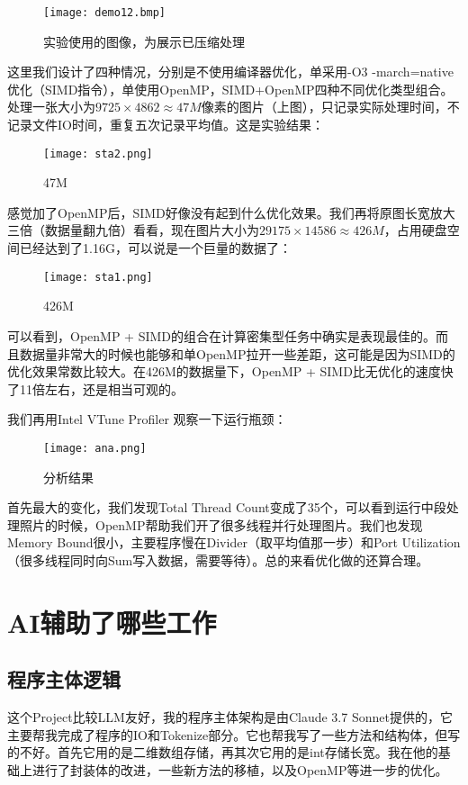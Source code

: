 \documentclass[11pt]{article}
\begin{document}
\begin{figure}[H]
  \centering
  \texttt{[image: demo12.bmp]}
  \caption{实验使用的图像，为展示已压缩处理}
  \label{fig:example}
\end{figure}


这里我们设计了四种情况，分别是不使用编译器优化，单采用-O3 -march=native优化（SIMD指令），单使用OpenMP，SIMD+OpenMP四种不同优化类型组合。处理一张大小为$9725\times 4862 \approx 47M$像素的图片（上图），只记录实际处理时间，不记录文件IO时间，重复五次记录平均值。这是实验结果：

\begin{figure}[H]
  \centering
  \texttt{[image: sta2.png]}
  \caption{47M}
  \label{fig:example}
\end{figure}

感觉加了OpenMP后，SIMD好像没有起到什么优化效果。我们再将原图长宽放大三倍（数据量翻九倍）看看，现在图片大小为$29175\times 14586 \approx 426M$，占用硬盘空间已经达到了1.16G，可以说是一个巨量的数据了：

\begin{figure}[H]
  \centering
  \texttt{[image: sta1.png]}
  \caption{426M}
  \label{fig:example}
\end{figure}

可以看到，OpenMP + SIMD的组合在计算密集型任务中确实是表现最佳的。而且数据量非常大的时候也能够和单OpenMP拉开一些差距，这可能是因为SIMD的优化效果常数比较大。在426M的数据量下，OpenMP + SIMD比无优化的速度快了11倍左右，还是相当可观的。


我们再用Intel VTune Profiler 观察一下运行瓶颈：

\begin{figure}[H]
  \centering
  \texttt{[image: ana.png]}
  \caption{分析结果}
  \label{fig:example}
\end{figure}

首先最大的变化，我们发现Total Thread Count变成了35个，可以看到运行中段处理照片的时候，OpenMP帮助我们开了很多线程并行处理图片。我们也发现Memory Bound很小，主要程序慢在Divider（取平均值那一步）和Port Utilization（很多线程同时向Sum写入数据，需要等待）。总的来看优化做的还算合理。
\section{AI辅助了哪些工作}

\subsection{程序主体逻辑}
这个Project比较LLM友好，我的程序主体架构是由Claude 3.7 Sonnet提供的，它主要帮我完成了程序的IO和Tokenize部分。它也帮我写了一些方法和结构体，但写的不好。首先它用的是二维数组存储，再其次它用的是int存储长宽。我在他的基础上进行了封装体的改进，一些新方法的移植，以及OpenMP等进一步的优化。
\end{document}
